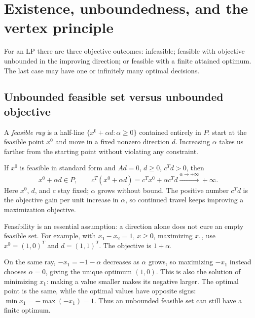 \documentclass[11pt,a4paper]{article}
\begin{document}
\section{Existence, unboundedness, and the vertex principle}\label{sec:outcomes}
For an LP there are three objective outcomes: infeasible; feasible with objective
unbounded in the improving direction; or feasible with a finite attained optimum.
The last case may have one or infinitely many optimal decisions.

\subsection{Unbounded feasible set versus unbounded objective}
A \emph{feasible ray} is a half-line $\{x^0+\alpha d:\alpha\geq0\}$
contained entirely in $P$: start at the feasible point $x^0$ and move in a
fixed nonzero direction $d$. Increasing $\alpha$ takes us farther from the
starting point without violating any constraint.

If $x^0$ is feasible in standard form and $Ad=0$, $d\geq0$, $c^Td>0$, then
\[
  x^0+\alpha d\in P,\qquad
  c^T(x^0+\alpha d)=c^Tx^0+\alpha c^Td
  \xrightarrow{\alpha\to+\infty}+\infty.
\]
Here $x^0$, $d$, and $c$ stay fixed; $\alpha$ grows without bound.
The positive number $c^Td$ is the objective gain per unit increase in $\alpha$,
so continued travel keeps improving a maximization objective.

Feasibility is an essential assumption: a direction alone does not cure an empty
feasible set. For example, with $x_1-x_2=1$, $x\geq0$, maximizing $x_1$,
use $x^0=(1,0)^T$ and $d=(1,1)^T$. The objective is $1+\alpha$.

On the same ray, $-x_1=-1-\alpha$ decreases as $\alpha$ grows, so maximizing
$-x_1$ instead chooses $\alpha=0$, giving the unique optimum $(1,0)$.
This is also the solution of minimizing $x_1$: making a value smaller makes
its negative larger. The optimal point is the same, while the optimal values
have opposite signs: $\min x_1=-\max(-x_1)=1$.
Thus an unbounded feasible set can still have a finite optimum.
\end{document}
